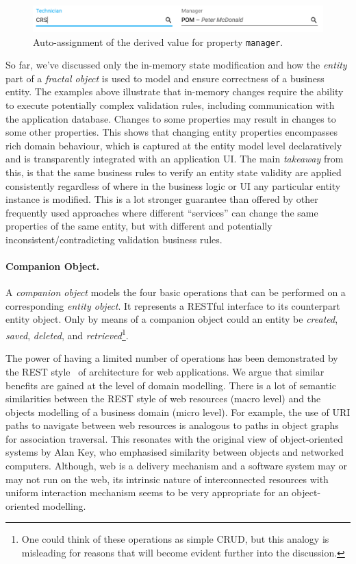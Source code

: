 \documentclass[a4paper,12pt,oneside,openright,final]{memoir} %
\begin{document}
	\begin{figure}[!h]
  		\centering
      	\includegraphics[width=1.0\textwidth]{images/05-wa-technician-entered.png}  
   	  	\caption{Auto-assignment of the derived value for property \texttt{manager}.}
   		\label{fig:derived-manager}
  	\end{figure}
	
	
	So far, we've discussed only the in-memory state modification and how the \emph{entity} part of a \emph{fractal object} is used to model and ensure correctness of a business entity.
	The examples above illustrate that in-memory changes require the ability to execute potentially complex validation rules, including communication with the application database.
	Changes to some properties may result in changes to some other properties.
	This shows that changing entity properties encompasses rich domain behaviour, which is captured at the entity model level declaratively and is transparently integrated with an application UI.
	The main \emph{takeaway} from this, is that the same business rules to verify an entity state validity are applied consistently regardless of where in the business logic or UI any particular entity instance is modified.
	This is a lot stronger guarantee than offered by other frequently used approaches where different ``services'' can change the same properties of the same entity, but with different and potentially inconsistent/contradicting validation business rules.
	
	\paragraph{Companion Object.}	
	A \emph{companion object} models the four basic operations that can be performed on a corresponding \emph{entity object}.
	It represents a RESTful interface to its counterpart entity object.
	Only by means of a companion object could an entity be \emph{created}, \emph{saved}, \emph{deleted}, and \emph{retrieved}\footnote{One could think of these operations as simple CRUD, but this analogy is misleading for reasons that will become evident further into the discussion.}.
	
	The power of having a limited number of operations has been demonstrated by the REST style~\cite{Fielding2000} of architecture for web applications.
	We argue that similar benefits are gained at the level of domain modelling.
  	There is a lot of semantic similarities between the REST style of web resources (macro level) and the objects modelling of a business domain (micro level).
  	For example, the use of URI paths to navigate between web resources is analogous to paths in object graphs for association traversal.
  	This resonates with the original view of object-oriented systems by Alan Key, who emphasised similarity between objects and networked computers.
  	Although, web is a delivery mechanism and a software system may or may not run on the web, its intrinsic nature of interconnected resources with uniform interaction mechanism seems to be very appropriate for an object-oriented modelling.
\end{document}
